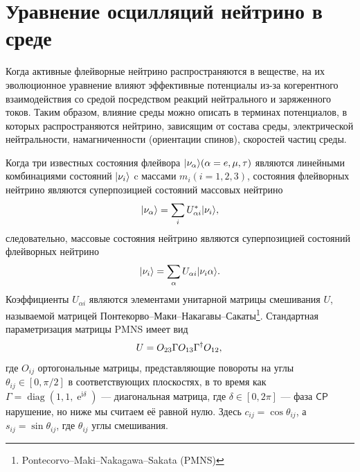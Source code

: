 \documentclass[a4paper,12pt]{article}
\newcommand{\diag}{\operatorname{diag}}
\renewcommand{\exp}{\operatorname{e}}
\renewcommand{\imath}{\mathrm{i}}
\DeclarePairedDelimiter\ket{|}{\rangle}
\begin{document}
	\newpage
	\section{Уравнение осцилляций нейтрино в среде}
	Когда активные флейворные нейтрино распространяются в веществе, на их
	эволюционное уравнение влияют эффективные потенциалы из-за когерентного
	взаимодействия со средой посредством реакций нейтрального и заряженного
	токов. Таким образом, влияние среды можно описать в терминах потенциалов, в
	которых распространяются нейтрино, зависящим от состава среды, электрической
	нейтральности, намагниченности (ориентации спинов), скоростей частиц среды.

	Когда три известных состояния флейвора \(\ket{\nu_{\alpha}} (\alpha= e, \mu, \tau)\) являются линейными комбинациями состояний \(\ket{\nu_{i}}\) c массами \(m_{i} (i=1,2,3)\), состояния флейворных нейтрино являются суперпозицией состояний
	массовых нейтрино
	\begin{equation}\label{eq:11}
		\ket{\nu_{\alpha}}=\sum_{i}U_{\alpha i}^{*}\ket{\nu_{i}},
	\end{equation}
	следовательно, массовые состояния нейтрино являются суперпозицией состояний флейворных нейтрино
	\begin{equation}\label{eq:11a}
		\ket{\nu_{i}}=\sum_{\alpha}U_{\alpha i}\ket{\nu_{i}{\alpha}}.
	\end{equation}
	Коэффициенты \(U_{\alpha i}\) являются элементами унитарной матрицы
	смешивания \(U\), называемой матрицей
	Понтекорво--Маки--Накагавы--Сакаты\footnote{Pontecorvo--Maki--Nakagawa--Sakata
	(PMNS)}. Стандартная параметризация матрицы PMNS имеет вид
	\begin{equation}
		U=O_{23}\Gamma O_{13}\Gamma^{\dagger}O_{12},\\
	\end{equation}
	где \(O_{ij}\) ортогональные матрицы, представляющие повороты на углы \(\theta_{ij}\in[0, \pi/2]\) в соответствующих плоскостях, в то время как \(\Gamma=\diag(1,1,\exp^{\imath\delta})\) --- диагональная матрица, где
	\(\delta\in[0, 2\pi]\) --- фаза \(\mathsf{CP}\) нарушение, но ниже мы считаем
	её равной нулю. Здесь \(c_{ij}=\cos\theta_{ij}\), а \(s_{ij}=\sin\theta_{ij}\), где \(\theta_{ij}\) углы смешивания.
\end{document}
